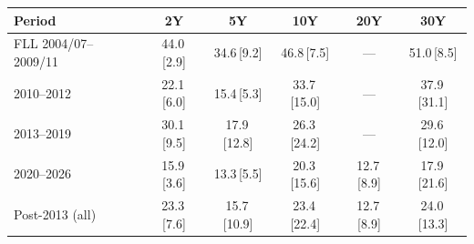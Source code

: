 \begin{tabular}{lccccc}
\toprule
Period & 2Y & 5Y & 10Y & 20Y & 30Y \\
\midrule
FLL 2004/07--2009/11 & 44.0\,[2.9] & 34.6\,[9.2] & 46.8\,[7.5] & --- & 51.0\,[8.5] \\
2010--2012 & 22.1\,[6.0] & 15.4\,[5.3] & 33.7\,[15.0] & --- & 37.9\,[31.1] \\
2013--2019 & 30.1\,[9.5] & 17.9\,[12.8] & 26.3\,[24.2] & --- & 29.6\,[12.0] \\
2020--2026 & 15.9\,[3.6] & 13.3\,[5.5] & 20.3\,[15.6] & 12.7\,[8.9] & 17.9\,[21.6] \\
Post-2013 (all) & 23.3\,[7.6] & 15.7\,[10.9] & 23.4\,[22.4] & 12.7\,[8.9] & 24.0\,[13.3] \\
\bottomrule
\end{tabular}
